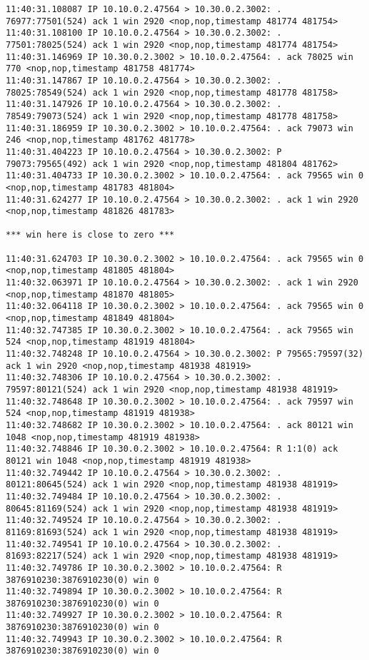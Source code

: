 \documentclass[a4paper,12pt]{article}
\begin{document}
\begin{lstlisting}
11:40:31.108087 IP 10.10.0.2.47564 > 10.30.0.2.3002: . 76977:77501(524) ack 1 win 2920 <nop,nop,timestamp 481774 481754>
11:40:31.108100 IP 10.10.0.2.47564 > 10.30.0.2.3002: . 77501:78025(524) ack 1 win 2920 <nop,nop,timestamp 481774 481754>
11:40:31.146969 IP 10.30.0.2.3002 > 10.10.0.2.47564: . ack 78025 win 770 <nop,nop,timestamp 481758 481774>
11:40:31.147867 IP 10.10.0.2.47564 > 10.30.0.2.3002: . 78025:78549(524) ack 1 win 2920 <nop,nop,timestamp 481778 481758>
11:40:31.147926 IP 10.10.0.2.47564 > 10.30.0.2.3002: . 78549:79073(524) ack 1 win 2920 <nop,nop,timestamp 481778 481758>
11:40:31.186959 IP 10.30.0.2.3002 > 10.10.0.2.47564: . ack 79073 win 246 <nop,nop,timestamp 481762 481778>
11:40:31.404223 IP 10.10.0.2.47564 > 10.30.0.2.3002: P 79073:79565(492) ack 1 win 2920 <nop,nop,timestamp 481804 481762>
11:40:31.404733 IP 10.30.0.2.3002 > 10.10.0.2.47564: . ack 79565 win 0 <nop,nop,timestamp 481783 481804>
11:40:31.624277 IP 10.10.0.2.47564 > 10.30.0.2.3002: . ack 1 win 2920 <nop,nop,timestamp 481826 481783>

*** win here is close to zero ***

11:40:31.624703 IP 10.30.0.2.3002 > 10.10.0.2.47564: . ack 79565 win 0 <nop,nop,timestamp 481805 481804>
11:40:32.063971 IP 10.10.0.2.47564 > 10.30.0.2.3002: . ack 1 win 2920 <nop,nop,timestamp 481870 481805>
11:40:32.064118 IP 10.30.0.2.3002 > 10.10.0.2.47564: . ack 79565 win 0 <nop,nop,timestamp 481849 481804>
11:40:32.747385 IP 10.30.0.2.3002 > 10.10.0.2.47564: . ack 79565 win 524 <nop,nop,timestamp 481919 481804>
11:40:32.748248 IP 10.10.0.2.47564 > 10.30.0.2.3002: P 79565:79597(32) ack 1 win 2920 <nop,nop,timestamp 481938 481919>
11:40:32.748306 IP 10.10.0.2.47564 > 10.30.0.2.3002: . 79597:80121(524) ack 1 win 2920 <nop,nop,timestamp 481938 481919>
11:40:32.748648 IP 10.30.0.2.3002 > 10.10.0.2.47564: . ack 79597 win 524 <nop,nop,timestamp 481919 481938>
11:40:32.748682 IP 10.30.0.2.3002 > 10.10.0.2.47564: . ack 80121 win 1048 <nop,nop,timestamp 481919 481938>
11:40:32.748846 IP 10.30.0.2.3002 > 10.10.0.2.47564: R 1:1(0) ack 80121 win 1048 <nop,nop,timestamp 481919 481938>
11:40:32.749442 IP 10.10.0.2.47564 > 10.30.0.2.3002: . 80121:80645(524) ack 1 win 2920 <nop,nop,timestamp 481938 481919>
11:40:32.749484 IP 10.10.0.2.47564 > 10.30.0.2.3002: . 80645:81169(524) ack 1 win 2920 <nop,nop,timestamp 481938 481919>
11:40:32.749524 IP 10.10.0.2.47564 > 10.30.0.2.3002: . 81169:81693(524) ack 1 win 2920 <nop,nop,timestamp 481938 481919>
11:40:32.749541 IP 10.10.0.2.47564 > 10.30.0.2.3002: . 81693:82217(524) ack 1 win 2920 <nop,nop,timestamp 481938 481919>
11:40:32.749786 IP 10.30.0.2.3002 > 10.10.0.2.47564: R 3876910230:3876910230(0) win 0
11:40:32.749894 IP 10.30.0.2.3002 > 10.10.0.2.47564: R 3876910230:3876910230(0) win 0
11:40:32.749927 IP 10.30.0.2.3002 > 10.10.0.2.47564: R 3876910230:3876910230(0) win 0
11:40:32.749943 IP 10.30.0.2.3002 > 10.10.0.2.47564: R 3876910230:3876910230(0) win 0
\end{lstlisting}
\end{document}
